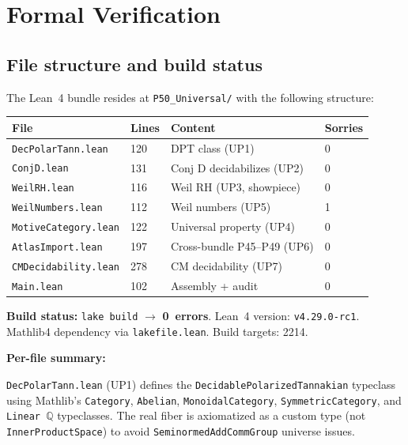 \documentclass[11pt]{article}
\theoremstyle{definition}
\theoremstyle{remark}
\newcommand{\Q}{\mathbb{Q}}
\begin{document}
\section{Formal Verification}
\label{sec:formal}

\subsection{File structure and build status}

The Lean~4 bundle resides at \texttt{P50\_Universal/} with the following structure:

\begin{center}
\begin{tabular}{llll}
\toprule
\textbf{File} & \textbf{Lines} & \textbf{Content} & \textbf{Sorries} \\
\midrule
\texttt{DecPolarTann.lean} & 120 & DPT class (UP1) & 0 \\
\texttt{ConjD.lean} & 131 & Conj D decidabilizes (UP2) & 0 \\
\texttt{WeilRH.lean} & 116 & Weil RH (UP3, showpiece) & 0 \\
\texttt{WeilNumbers.lean} & 112 & Weil numbers (UP5) & 1 \\
\texttt{MotiveCategory.lean} & 122 & Universal property (UP4) & 0 \\
\texttt{AtlasImport.lean} & 197 & Cross-bundle P45--P49 (UP6) & 0 \\
\texttt{CMDecidability.lean} & 278 & CM decidability (UP7) & 0 \\
\texttt{Main.lean} & 102 & Assembly + audit & 0 \\
\bottomrule
\end{tabular}
\end{center}

\medskip\noindent
\textbf{Build status:} \texttt{lake build} $\to$ \textbf{0~errors}. Lean~4 version: \texttt{v4.29.0-rc1}. Mathlib4 dependency via \texttt{lakefile.lean}. Build targets: 2214.

\smallskip\noindent
\textbf{Per-file summary:}

\texttt{DecPolarTann.lean} (UP1) defines the \texttt{DecidablePolarizedTannakian} typeclass using Mathlib's \texttt{Category}, \texttt{Abelian}, \texttt{MonoidalCategory}, \texttt{SymmetricCategory}, and \texttt{Linear~$\Q$} typeclasses. The real fiber is axiomatized as a custom type (not \texttt{InnerProductSpace}) to avoid \texttt{SeminormedAddCommGroup} universe issues.
\end{document}
